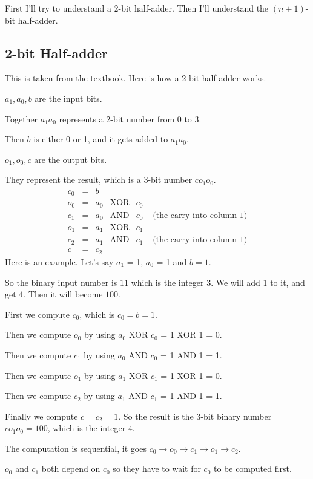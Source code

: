 \documentclass[14pt]{extarticle}
\begin{document}
First I'll try to understand a 2-bit half-adder. Then I'll understand the $(n+1)$-bit half-adder.

\subsection{2-bit Half-adder}
This is taken from the textbook. Here is how a 2-bit half-adder works. 

$a_1, a_0, b$ are the input bits. 

Together $a_1a_0$ represents a 2-bit number from 0 to 3. 

Then $b$ is either 0 or 1, and it gets added to $a_1a_0$.

$o_1, o_0, c$ are the output bits. 

They represent the result, which is a 3-bit number $co_1o_0$.
$$
\begin{array}{cccccc}
c_0 & = &  b  &            &     &  \\
o_0 & = & a_0 & \text{XOR} & c_0 &  \\
c_1 & = & a_0 & \text{AND} & c_0 & \text{ (the carry into column 1)} \\
o_1 & = & a_1 & \text{XOR} & c_1 &  \\
c_2 & = & a_1 & \text{AND} & c_1 & \text{ (the carry into column 1)} \\
c   & = & c_2 &            &     &  
\end{array}
$$
Here is an example. Let's say $a_1$ = 1, $a_0$ = 1 and $b = 1$.

So the binary input number is $11$ which is the integer 3. We will add 1 to it, and get 4. Then it will become $100$.

First we compute $c_0$, which is $c_0 = b = 1$.

Then we compute $o_0$ by using $a_0$ XOR $c_0$ = 1 XOR 1 = 0.

Then we compute $c_1$ by using $a_0$ AND $c_0$ = 1 AND 1 = 1.

Then we compute $o_1$ by using $a_1$ XOR $c_1$ = 1 XOR 1 = 0.

Then we compute $c_2$ by using $a_1$ AND $c_1$ = 1 AND 1 = 1.

Finally we compute $c = c_2 = 1$. So the result is the 3-bit binary number $co_1o_0 = 100$, which is the integer 4.

The computation is sequential, it goes $c_0 \rightarrow o_0 \rightarrow c_1 \rightarrow o_1 \rightarrow c_2$.

$o_0$ and $c_1$ both depend on $c_0$ so they have to wait for $c_0$ to be computed first.
\end{document}
